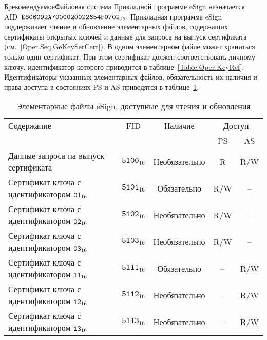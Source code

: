 \begin{appendix}{Б}{рекомендуемое}{Файловая система}
Прикладной программе eSign назначается AID~$\texttt{E806092A7000020022654F0702}_{16}$. 
%
Прикладная программа eSign поддерживает чтение и обновление 
элементарных файлов, содержащих сертификаты открытых ключей и данные для
запроса на выпуск сертификата (см.~\ref{Oper.Seq.GeKeySetCert}). 
В одном элементарном файле может храниться только один
сертификат. При этом сертификат должен
соответствовать личному ключу, идентификатор которого приводится
в таблице~\ref{Table.Oper.KeyRef}.
Идентификаторы указанных элементарных файлов, обязательность
их наличия и права доступа в состояниях PS и AS
приводятся в таблице~\ref{Table.FILES.EFSIGN}.
 
\begin{table}[bht]
\caption{Элементарные файлы eSign, доступные для чтения и обновления}
\label{Table.FILES.EFSIGN}
\begin{tabular}{|l|c|c|c|c|}
\hline
Содержание & FID & Наличие & \multicolumn{2}{|c|}{Доступ}\\
\cline{4-5}
& & & PS & AS \\
\hline
\hline
Данные запроса на выпуск сертификата & 
$\texttt{5100}_{16}$ & Необязательно &  R & R/W \\
Сертификат ключа с идентификатором $\texttt{01}_{16}$ & 
$\texttt{5101}_{16}$ & Обязательно & R/W & -- \\
Сертификат ключа с идентификатором $\texttt{02}_{16}$ & 
$\texttt{5102}_{16}$ & Необязательно & R/W & -- \\
Сертификат ключа с идентификатором $\texttt{03}_{16}$ & 
$\texttt{5103}_{16}$ & Необязательно & R/W & -- \\
Сертификат ключа с идентификатором $\texttt{11}_{16}$ & 
$\texttt{5111}_{16}$ & Обязательно & -- & R/W \\
Сертификат ключа с идентификатором $\texttt{12}_{16}$ & 
$\texttt{5112}_{16}$ & Необязательно &  -- & R/W \\
Сертификат ключа с идентификатором $\texttt{13}_{16}$ & 
$\texttt{5113}_{16}$ & Необязательно & -- & R/W \\
\hline
\end{tabular}
\end{table}

\end{appendix}